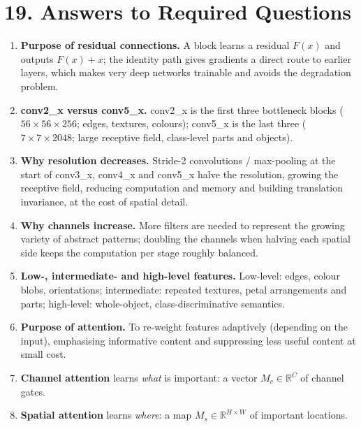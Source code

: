 \documentclass[10pt]{article}
\begin{document}
\section*{19. Answers to Required Questions}

\begin{enumerate}\small

\item \textbf{Purpose of residual connections.} A block learns a residual $F(x)$ and outputs $F(x)+x$; the identity path gives gradients a direct route to earlier layers, which makes very deep networks trainable and avoids the degradation problem.

\item \textbf{conv2\_x versus conv5\_x.} conv2\_x is the first three bottleneck blocks ($56\times56\times256$; edges, textures, colours); conv5\_x is the last three ($7\times7\times2048$; large receptive field, class-level parts and objects).

\item \textbf{Why resolution decreases.} Stride-2 convolutions / max-pooling at the start of conv3\_x, conv4\_x and conv5\_x halve the resolution, growing the receptive field, reducing computation and memory and building translation invariance, at the cost of spatial detail.

\item \textbf{Why channels increase.} More filters are needed to represent the growing variety of abstract patterns; doubling the channels when halving each spatial side keeps the computation per stage roughly balanced.

\item \textbf{Low-, intermediate- and high-level features.} Low-level: edges, colour blobs, orientations; intermediate: repeated textures, petal arrangements and parts; high-level: whole-object, class-discriminative semantics.

\item \textbf{Purpose of attention.} To re-weight features adaptively (depending on the input), emphasising informative content and suppressing less useful content at small cost.

\item \textbf{Channel attention} learns \emph{what} is important: a vector $M_c\in\mathbb{R}^C$ of channel gates.

\item \textbf{Spatial attention} learns \emph{where}: a map $M_s\in\mathbb{R}^{H\times W}$ of important locations.


\end{enumerate}
\end{document}
